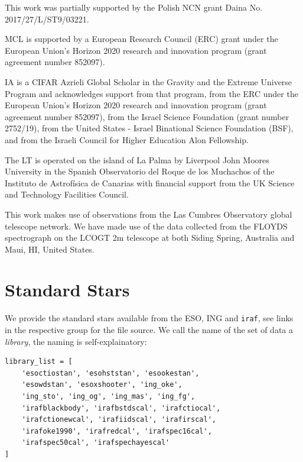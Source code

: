 \documentclass[fleqn,usenatbib]{mnras}
\begin{document}
This work was partially supported by the Polish NCN grant Daina
No. 2017/27/L/ST9/03221.

MCL is supported by a European Research Council (ERC) grant under the European Union’s Horizon 2020 research and innovation program (grant agreement number 852097).

IA is a CIFAR Azrieli Global Scholar in the Gravity and the Extreme Universe Program and acknowledges support from that program, from the ERC under the European Union’s Horizon 2020 research and innovation program (grant agreement number 852097), from the Israel Science Foundation (grant number 2752/19), from the United States - Israel Binational Science Foundation (BSF), and from the Israeli Council for Higher Education Alon Fellowship.

The LT is operated on the island of La Palma by Liverpool
John Moores University in the Spanish Observatorio del Roque
de los Muchachos of the Instituto de Astrof{\'i}sica de Canarias with
financial support from the UK Science and Technology Facilities
Council.

This work makes use of observations from the Las Cumbres Observatory
global telescope network. We have made use of the data collected from
the FLOYDS spectrograph on the LCOGT 2m telescope at both Siding Spring,
Australia and Maui, HI, United States.







\appendix

\section{Standard Stars}
\label{appendix:standards}
We provide the standard stars available from the ESO, ING and \texttt{iraf}, see
links in the respective group for the file source. We call the name of the set of
data a \textit{library}, the naming is self-explainatory:

\begin{verbatim}
library_list = [
    'esoctiostan', 'esohststan', 'esookestan',
    'esowdstan', 'esoxshooter', 'ing_oke',
    'ing_sto', 'ing_og', 'ing_mas', 'ing_fg',
    'irafblackbody', 'irafbstdscal', 'irafctiocal',
    'irafctionewcal', 'irafiidscal', 'irafirscal',
    'irafoke1990', 'irafredcal', 'irafspec16cal',
    'irafspec50cal', 'irafspechayescal'
]
\end{verbatim}
\end{document}

